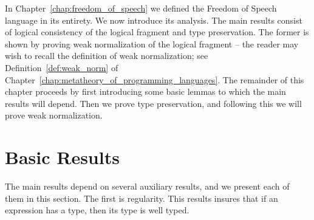 In Chapter~\ref{chap:freedom_of_speech} we defined the Freedom of
Speech language in its entirety.  We now introduce its analysis.  The
main results consist of logical consistency of the logical fragment
and type preservation.  The former is shown by proving weak
normalization of the logical fragment -- the reader may wish to recall
the definition of weak normalization; see
Definition~\ref{def:weak_norm} of
Chapter~\ref{chap:metatheory_of_programming_languages}.  The remainder
of this chapter proceeds by first introducing some basic lemmas to
which the main results will depend.  Then we prove type preservation,
and following this we will prove weak normalization.

\section{Basic Results}
\label{sec:basic_results}
The main results depend on several auxiliary results, and we present
each of them in this section.  The first is regularity.  This results
insures that if an expression has a type, then its type is well typed.

